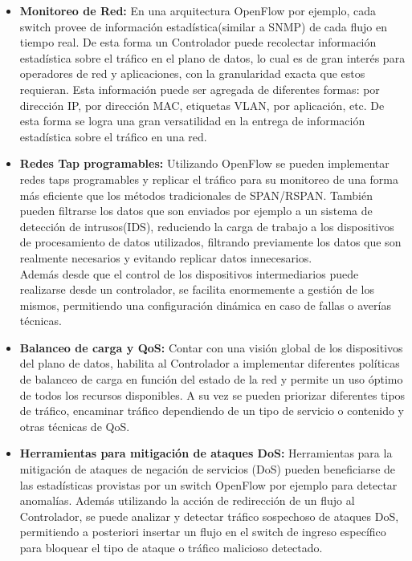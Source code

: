 \begin{itemize}

\item \textbf{Monitoreo de Red:}
En una arquitectura OpenFlow por ejemplo, cada switch provee de información estadística(similar a SNMP) de cada flujo en tiempo real. De esta forma un Controlador puede recolectar información estadística sobre el tráfico en el plano de datos, lo cual es de gran interés para operadores de red y aplicaciones, con la granularidad exacta que estos requieran. Esta información puede ser agregada de diferentes formas: por dirección IP, por dirección MAC, etiquetas VLAN, por aplicación, etc. De esta forma se logra una gran versatilidad en la entrega de información estadística sobre el tráfico en una red.

\item \textbf{Redes Tap programables:}
Utilizando OpenFlow se pueden implementar redes taps programables y replicar el tráfico para su monitoreo de una forma más eficiente que los métodos tradicionales de SPAN/RSPAN. También pueden filtrarse los datos que son enviados por ejemplo a un sistema de detección de intrusos(IDS), reduciendo la carga de trabajo a los dispositivos de procesamiento de datos utilizados, filtrando previamente los datos que son realmente necesarios y evitando replicar datos innecesarios.\\
Además desde que el control de los dispositivos intermediarios puede realizarse desde un controlador, se facilita enormemente a gestión de los mismos, permitiendo una configuración dinámica en caso de fallas o averías técnicas.

\item \textbf{Balanceo de carga y QoS:}
Contar con una visión global de los dispositivos del plano de datos, habilita al Controlador a implementar diferentes políticas de balanceo de carga en función del estado de la red y permite un uso óptimo de todos los recursos disponibles. A su vez se pueden priorizar diferentes tipos de tráfico, encaminar tráfico dependiendo de un tipo de servicio o contenido y otras técnicas de QoS.

\item \textbf{Herramientas para mitigación de ataques DoS:}
Herramientas para la mitigación de ataques de negación de servicios (DoS) pueden beneficiarse de las estadísticas provistas por un switch OpenFlow por ejemplo para detectar anomalías. Además utilizando la acción de redirección de un flujo al Controlador, se puede analizar y detectar tráfico sospechoso de ataques DoS, permitiendo a posteriori insertar un flujo en el switch de ingreso específico para bloquear el tipo de ataque o tráfico malicioso detectado.


\end{itemize}
